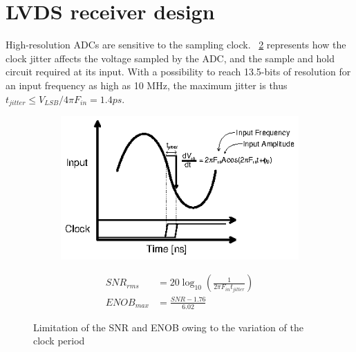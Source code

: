 \section{LVDS receiver design}
High-resolution ADCs are sensitive to the sampling clock. \figurename~\ref{fig:adc-jitter} represents how the clock jitter affects the voltage sampled by the ADC, and the sample and hold circuit required at its input. With a possibility to reach 13.5-bits of resolution for an input frequency as high as 10 MHz, the maximum jitter is thus $t_{jitter} \leq V_{LSB}/4\pi F_{in} = 1.4 ps$.

\begin{figure}[htp]
    \centering
    \begin{subfigure}[b]{0.48\textwidth}
        \includegraphics[width=\textwidth]{Chapter5/Figs/lvds/aperture_jitter.ps}
        \label{}
    \end{subfigure}
    \begin{subfigure}[b]{0.48\textwidth}
        \begin{align}
            SNR_{rms}  &= 20\log_{10}\left(\frac{1}{2\pi F_{in}t_{jitter}} \right) \\
            ENOB_{max} &= \frac{SNR-1.76}{6.02}
        \end{align}
        \vspace{2em}
    \end{subfigure}
    \caption{Limitation of the SNR and ENOB owing to the variation of the clock period}
    \label{fig:adc-jitter}
\end{figure}

